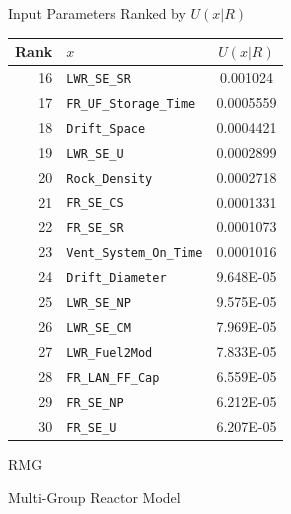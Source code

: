 \documentclass[pdf, autumn, slideColor, nocolorBG]{prosper}
\begin{document}
\begin{slide}{Input Parameters Ranked by $U(x|R)$}
\begin{center}
\tiny
\begin{tabular}{|r|l|c|}
\hline
\textbf{Rank} & \textbf{$x$} & \textbf{$U(x|R)$}\\
\hline
16&\texttt{LWR\_SE\_SR}&0.001024\\
\hline
17&\texttt{FR\_UF\_Storage\_Time}&0.0005559\\
\hline
18&\texttt{Drift\_Space}&0.0004421\\
\hline
19&\texttt{LWR\_SE\_U}&0.0002899\\
\hline
20&\texttt{Rock\_Density}&0.0002718\\
\hline
21&\texttt{FR\_SE\_CS}&0.0001331\\
\hline
22&\texttt{FR\_SE\_SR}&0.0001073\\
\hline
23&\texttt{Vent\_System\_On\_Time}&0.0001016\\
\hline
24&\texttt{Drift\_Diameter}&9.648E-05\\
\hline
25&\texttt{LWR\_SE\_NP}&9.575E-05\\
\hline
26&\texttt{LWR\_SE\_CM}&7.969E-05\\
\hline
27&\texttt{LWR\_Fuel2Mod}&7.833E-05\\
\hline
28&\texttt{FR\_LAN\_FF\_Cap}&6.559E-05\\
\hline
29&\texttt{FR\_SE\_NP}&6.212E-05\\
\hline
30&\texttt{FR\_SE\_U}&6.207E-05\\
\hline
\end{tabular}
\end{center}
\end{slide}








%
%

\begin{slide}{RMG}
\vspace{3.5cm}
\begin{center}
\Large
Multi-Group Reactor Model
\end{center}
\end{slide}
\end{document}
